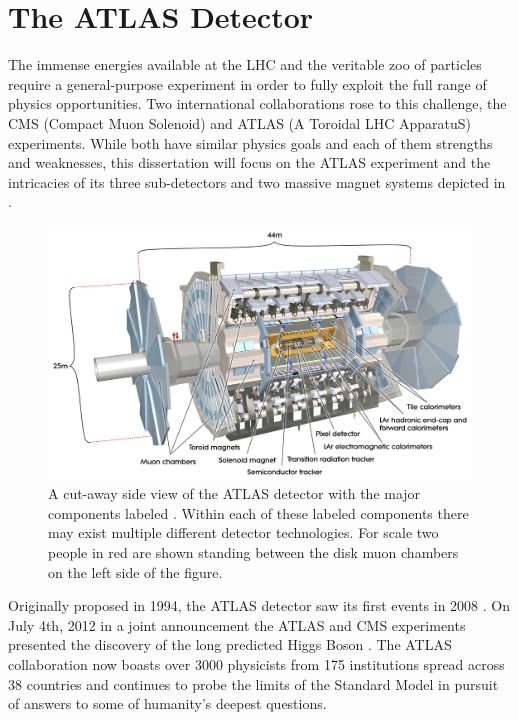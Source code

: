 \chapter{The ATLAS Detector} \label{chap:atlas}

The immense energies available at the LHC and the veritable zoo of
particles require a general-purpose experiment in
order to fully exploit the full range of physics opportunities.  Two
international collaborations rose to this challenge, the CMS (Compact Muon
Solenoid) and ATLAS (A Toroidal LHC ApparatuS) experiments.  While both have
similar physics goals and each of them strengths and weaknesses, this
dissertation will focus on the ATLAS experiment and the intricacies of its three
sub-detectors and two massive magnet systems depicted in
.

\begin{figure}[!htbp]
  \begin{center}
    \includegraphics[width=0.9\linewidth]{figures/atlas/atlas_cutaway.pdf}
    \caption{A cut-away side view of the ATLAS detector with the major
components labeled \cite{PERF-2007-01}.  Within each of these labeled
components there may exist multiple different detector technologies.  For scale
two people in red are shown standing between the disk muon chambers on the left
side of the figure. }
    \label{fig:atlas_cutaway}
  \end{center}
\end{figure}

Originally proposed in 1994, the ATLAS detector saw its first events in  2008
\cite{ATLAS_TDR, ATLAS_first_beam}. On July 4th, 2012 in a joint announcement
the ATLAS and CMS experiments presented the discovery of the long predicted
Higgs Boson \cite{Aad:2012tfa, Chatrchyan:2012xdj, higgs_announcement}.  The
ATLAS collaboration now boasts over 3000 physicists from 175 institutions
spread across 38 countries and continues to probe the limits of the Standard
Model in pursuit of answers to some of humanity's deepest questions.

